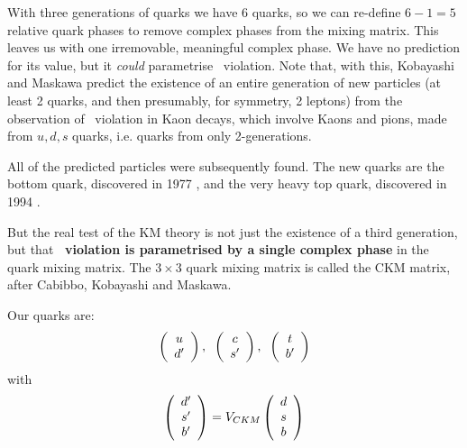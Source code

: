  With three generations of quarks we have 6 quarks, so we can
 re-define $6-1=5$ relative quark phases to remove complex phases from
 the mixing matrix.
%
 This leaves us with one irremovable, meaningful complex phase. We have
 no prediction for its value, but it \emph{could} parametrise \cp\
 violation. 
%
 Note that, with this, Kobayashi and Maskawa predict the existence of
 an entire generation of new particles (at least 2 quarks, and then
 presumably, for symmetry, 2 leptons) from the observation of \cp\
 violation in Kaon decays, which involve Kaons and pions, made from
 $u,d,s$ quarks, i.e. quarks from only 2-generations.

 All of the predicted particles were subsequently found. The new
 quarks are the bottom quark, discovered in 1977
 \cite{beautydiscovery}, and the very heavy top quark, discovered in
 1994 \cite{topdiscovery}.

 But the real test of the KM theory is not just the existence of a
 third generation, but that \textbf{\cp\ violation is parametrised by
 a single complex phase} in the quark mixing matrix. The $3\times 3$
 quark mixing matrix is called the CKM matrix, after Cabibbo,
 Kobayashi and Maskawa.

 Our quarks are:
\begin{equation}
 \left( \begin{array}{c} u \\ d^{\prime} \end{array} \right),\;\;  \left( \begin{array}{c} c \\ s^{\prime} \end{array} \right),\;\;  \left( \begin{array}{c} t \\ b^{\prime} \end{array} \right)
\end{equation}
 with
\begin{equation}
 \left( \begin{array}{c} d^{\prime} \\ s^{\prime} \\ b^{\prime}\end{array} \right) = V_{CKM} \left( \begin{array}{c} d \\ s \\ b\end{array} \right)
\end{equation}


